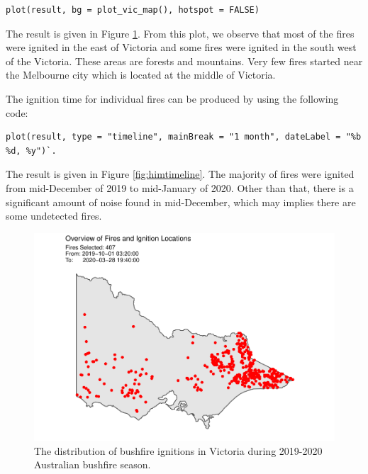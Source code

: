 \begin{verbatim}
plot(result, bg = plot_vic_map(), hotspot = FALSE)
\end{verbatim}

The result is given in Figure \ref{fig:clusteringfinalresults}. From
this plot, we observe that most of the fires were ignited in the east of
Victoria and some fires were ignited in the south west of the Victoria.
These areas are forests and mountains. Very few fires started near the
Melbourne city which is located at the middle of Victoria.

The ignition time for individual fires can be produced by using the
following code:

\begin{verbatim}
plot(result, type = "timeline", mainBreak = "1 month", dateLabel = "%b %d, %y")`. 
\end{verbatim}

The result is given in Figure \ref{fig:himtimeline}. The majority of
fires were ignited from mid-December of 2019 to mid-January of 2020.
Other than that, there is a significant amount of noise found in
mid-December, which may implies there are some undetected fires.

\begin{Schunk}
\begin{figure}

{\centering \includegraphics[width=0.8\linewidth]{clustering_paper_files/figure-latex/clusteringfinalresults-1} 

}

\caption[ The distribution of bushfire ignitions in Victoria during 2019-2020 Australian bushfire season]{ The distribution of bushfire ignitions in Victoria during 2019-2020 Australian bushfire season.}\label{fig:clusteringfinalresults}
\end{figure}
\end{Schunk}

